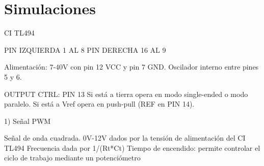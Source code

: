 \section{Simulaciones}

CI TL494 

PIN IZQUIERDA 1 AL 8
PIN DERECHA 16 AL 9

Alimentación: 7-40V con pin 12 VCC y pin 7 GND. 
Oscilador interno entre pines 5 y 6. 



OUTPUT CTRL: PIN 13
Si está a tierra opera en modo single-ended o modo paralelo. 
Si está a Vref opera en push-pull (REF en PIN 14). 

1) Señal PWM

Señal de onda cuadrada. 
0V-12V dados por la tensión de alimentación del CI TL494
Frecuencia dada por 1/(Rt*Ct)
Tiempo de encendido: permite controlar el ciclo de trabajo mediante un potenciómetro 

